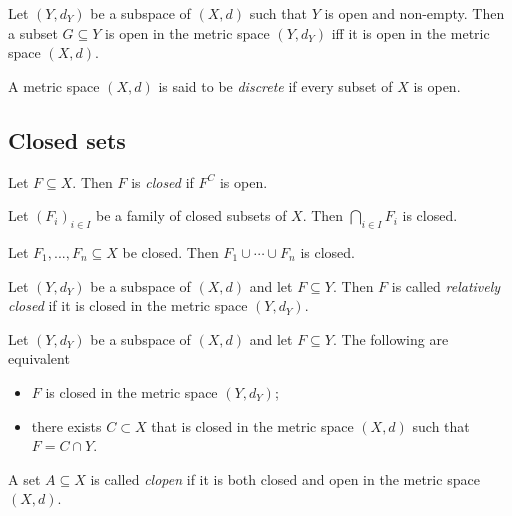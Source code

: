 \documentclass{article}
\begin{document}
\begin{proposition}
    Let $(Y,d_Y)$ be a subspace of $(X,d)$ such that $Y$ is open and non-empty. Then a 
    subset $G\subseteq Y$ is open in the metric space $(Y,d_Y)$ iff it is open in the 
    metric space $(X,d)$.
\end{proposition}

\begin{definition}
    A metric space $(X,d)$ is said to be \emph{discrete} if every subset of $X$ is open. 
\end{definition}

\subsection{Closed sets}

\begin{definition}
    Let $F\subseteq X$. Then $F$ is \emph{closed} if $F^C$ is open.
\end{definition}

\begin{theorem}[Notes 4.20]
    Let $(F_i)_{i\in I}$ be a family of closed subsets of $X$. Then $\bigcap_{i\in I}F_i$
    is closed. 
\end{theorem}

\begin{theorem}[Notes 4.21]
    Let $F_1,...,F_n\subseteq X$ be closed. Then $F_1\cup\cdots\cup F_n$ is closed. 
\end{theorem}

\begin{definition}
    Let $(Y,d_Y)$ be a subspace of $(X,d)$ and let $F\subseteq Y$. Then $F$ is called 
    \emph{relatively closed} if it is closed in the metric space $(Y,d_Y)$.
\end{definition}

\begin{proposition}
    Let $(Y,d_Y)$ be a subspace of $(X,d)$ and let $F\subseteq Y$. The following are 
    equivalent
    \begin{itemize}
        \item $F$ is closed in the metric space $(Y,d_Y)$;
        \item there exists $C\subset X$ that is closed in the metric space $(X,d)$ such that 
            $F=C\cap Y$.
    \end{itemize}
\end{proposition}

\begin{definition}
    A set $A\subseteq X$ is called \emph{clopen} if it is both closed and open 
    in the metric space $(X,d)$.
\end{definition}
\end{document}

